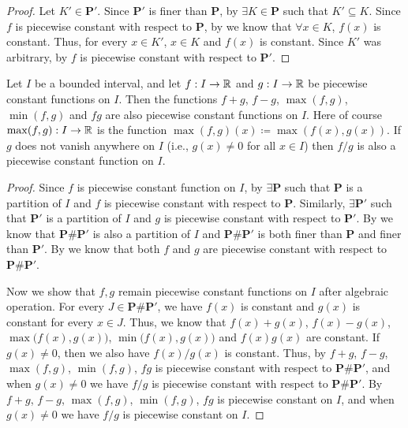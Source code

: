 \begin{proof}
  Let \(K' \in \mathbf{P}'\).
  Since \(\mathbf{P}'\) is finer than \(\mathbf{P}\), by  \(\exists K \in \mathbf{P}\) such that \(K' \subseteq K\).
  Since \(f\) is piecewise constant with respect to \(\mathbf{P}\), by  we know that \(\forall x \in K\), \(f(x)\) is constant.
  Thus, for every \(x \in K'\), \(x \in K\) and \(f(x)\) is constant.
  Since \(K'\) was arbitrary, by  \(f\) is piecewise constant with respect to \(\mathbf{P}'\).
\end{proof}

\begin{lem}\label{i:11.2.8}
  Let \(I\) be a bounded interval, and let \(f : I \to \mathbb{R}\) and \(g : I \to \mathbb{R}\) be piecewise constant functions on \(I\).
  Then the functions \(f + g\), \(f - g\), \(\max(f, g)\), \(\min(f, g)\) and \(fg\) are also piecewise constant functions on \(I\).
  Here of course \(\max(f, g) : I \to \mathbb{R}\) is the function \(\max(f, g)(x) \coloneqq \max(f(x), g(x))\).
  If \(g\) does not vanish anywhere on \(I\) (i.e., \(g(x) \neq 0\) for all \(x \in I\)) then \(f / g\) is also a piecewise constant function on \(I\).
\end{lem}

\begin{proof}
  Since \(f\) is piecewise constant function on \(I\), by  \(\exists \mathbf{P}\) such that \(\mathbf{P}\) is a partition of \(I\) and \(f\) is piecewise constant with respect to \(\mathbf{P}\).
  Similarly, \(\exists \mathbf{P}'\) such that \(\mathbf{P}'\) is a partition of \(I\) and \(g\) is piecewise constant with respect to \(\mathbf{P}'\).
  By  we know that \(\mathbf{P} \# \mathbf{P}'\) is also a partition of \(I\) and \(\mathbf{P} \# \mathbf{P}'\) is both finer than \(\mathbf{P}\) and finer than \(\mathbf{P}'\).
  By  we know that both \(f\) and \(g\) are piecewise constant with respect to \(\mathbf{P} \# \mathbf{P}'\).

  Now we show that \(f, g\) remain piecewise constant functions on \(I\) after algebraic operation.
  For every \(J \in \mathbf{P} \# \mathbf{P}'\), we have \(f(x)\) is constant and \(g(x)\) is constant for every \(x \in J\).
  Thus, we know that \(f(x) + g(x)\), \(f(x) - g(x)\), \(\max\big(f(x), g(x)\big)\), \(\min\big(f(x), g(x)\big)\) and \(f(x) g(x)\) are constant.
  If \(g(x) \neq 0\), then we also have \(f(x) / g(x)\) is constant.
  Thus, by  \(f + g\), \(f - g\), \(\max(f, g)\), \(\min(f, g)\), \(fg\) is piecewise constant with respect to \(\mathbf{P} \# \mathbf{P}'\), and when \(g(x) \neq 0\) we have \(f / g\) is piecewise constant with respect to \(\mathbf{P} \# \mathbf{P}'\).
  By  \(f + g\), \(f - g\), \(\max(f, g)\), \(\min(f, g)\), \(fg\) is piecewise constant on \(I\), and when \(g(x) \neq 0\) we have \(f / g\) is piecewise constant on \(I\).
\end{proof}

